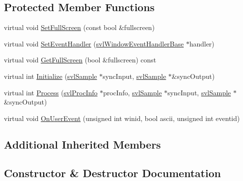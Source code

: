 \subsection*{Protected Member Functions}
\begin{DoxyCompactItemize}
\item 
virtual void \hyperlink{classsvl_filter_image_window_target_select_a61b13fa654f7e6538f159d58f26965a2}{Set\+Full\+Screen} (const bool \&fullscreen)
\item 
virtual void \hyperlink{classsvl_filter_image_window_target_select_a4515b7ffc3aa044b8f37aa911bed7c26}{Set\+Event\+Handler} (\hyperlink{classsvl_window_event_handler_base}{svl\+Window\+Event\+Handler\+Base} $\ast$handler)
\item 
virtual void \hyperlink{classsvl_filter_image_window_target_select_ad28d515cd18309353ad16326c758bbc6}{Get\+Full\+Screen} (bool \&fullscreen) const 
\item 
virtual int \hyperlink{classsvl_filter_image_window_target_select_aca39f4305073f8f64e8c3409cd1d397c}{Initialize} (\hyperlink{classsvl_sample}{svl\+Sample} $\ast$sync\+Input, \hyperlink{classsvl_sample}{svl\+Sample} $\ast$\&sync\+Output)
\item 
virtual int \hyperlink{classsvl_filter_image_window_target_select_a50bf9d071d52b8871993e8467387dbff}{Process} (\hyperlink{structsvl_proc_info}{svl\+Proc\+Info} $\ast$proc\+Info, \hyperlink{classsvl_sample}{svl\+Sample} $\ast$sync\+Input, \hyperlink{classsvl_sample}{svl\+Sample} $\ast$\&sync\+Output)
\item 
virtual void \hyperlink{classsvl_filter_image_window_target_select_a055043d8450c3d19c9c20ca84e4561a3}{On\+User\+Event} (unsigned int winid, bool ascii, unsigned int eventid)
\end{DoxyCompactItemize}
\subsection*{Additional Inherited Members}


\subsection{Constructor \& Destructor Documentation}
\hypertarget{classsvl_filter_image_window_target_select_aa2295fb4d3c9f3697fc9d598497f3a5c}{}
